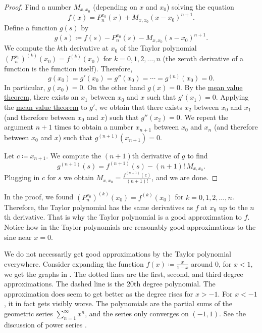 \begin{proof}
Find a number $M_{x,x_0}$ (depending on $x$ and $x_0$) solving the equation
\begin{equation*}
f(x)=P_{n}^{x_0}(x)+M_{x,x_0}{(x-x_0)}^{n+1} .
\end{equation*}
Define a function $g(s)$ by
\begin{equation*}
g(s) \coloneqq f(s)-P_n^{x_0}(s)-M_{x,x_0}{(s-x_0)}^{n+1} .
\end{equation*}
We compute
the $k$th derivative at $x_0$ of the Taylor polynomial
${(P_n^{x_0})}^{(k)}(x_0) = f^{(k)}(x_0)$ for
$k=0,1,2,\ldots,n$ (the zeroth derivative of a function is the function
itself).  Therefore,
\begin{equation*}
g(x_0) = g'(x_0) = g''(x_0) = \cdots = g^{(n)}(x_0) = 0 .
\end{equation*}
In particular, $g(x_0) = 0$.
On the other hand $g(x) = 0$.  By the
\hyperref[thm:mvt]{mean value theorem},
there exists an $x_1$ between $x_0$ and $x$ such that $g'(x_1) = 0$.
Applying the \hyperref[thm:mvt]{mean value theorem}
to $g'$, we obtain that there exists
$x_2$ between $x_0$ and $x_1$ (and therefore between $x_0$ and $x$)
such that $g''(x_2) = 0$.  We repeat the
argument $n+1$ times to obtain a number $x_{n+1}$ between $x_0$ and $x_n$
(and therefore between $x_0$ and $x$) such that $g^{(n+1)}(x_{n+1}) = 0$.

Let $c \coloneqq x_{n+1}$.
We compute the $(n+1)$th derivative of $g$ to find
\begin{equation*}
g^{(n+1)}(s) = f^{(n+1)}(s)-(n+1)!\,M_{x,x_0} .
\end{equation*}
Plugging in $c$ for $s$ we obtain $M_{x,x_0} = \frac{f^{(n+1)}(c)}{(n+1)!}$, and
we are done.
\end{proof}

In the proof, we found
${(P_n^{x_0})}^{(k)}(x_0) = f^{(k)}(x_0)$ for $k=0,1,2,\ldots,n$.
Therefore, the Taylor polynomial has the same derivatives as $f$ at $x_0$
up to the $n$th derivative.  That is why the Taylor polynomial is
a good approximation to $f$.
Notice how in  the Taylor polynomials are
reasonably good approximations to the sine near $x=0$.

We do not necessarily get good approximations
by the Taylor polynomial everywhere.
Consider expanding the function
$f(x) \coloneqq \frac{x}{1-x}$ around 0,
for $x < 1$, we get the graphs in
.  The dotted lines are the first, second, and
third degree approximations.
The dashed line is the 20th degree polynomial.
The approximation does seem to get
better as the degree rises for $x > -1$.
For $x < -1$, it in fact gets visibly worse.
The polynomials
are the partial sums of the geometric series $\sum_{n=1}^\infty x^n$,
and the series only converges on $(-1,1)$.
See the discussion of power series
.

